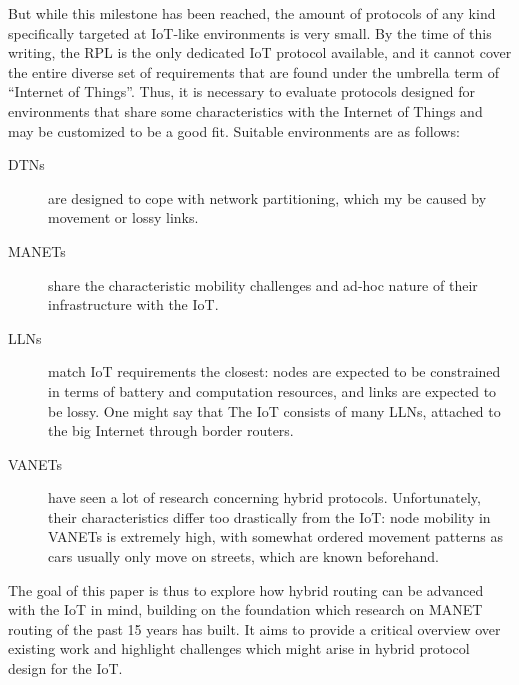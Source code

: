 \documentclass[a4paper,10pt]{scrartcl}
\begin{document}
But while this milestone has been reached, the amount of protocols of any kind specifically targeted at IoT-like environments is very small. By the time of this writing, the \gls{RPL}\cite{RFC-6550} is the only dedicated IoT protocol available, and it cannot cover the entire diverse set of requirements that are found under the umbrella term of ``Internet of Things''. Thus, it is necessary to evaluate protocols designed for environments that share some characteristics with the Internet of Things and may be customized to be a good fit. Suitable environments are as follows:
\begin{description}
\item[\glspl{DTN}] are designed to cope with network partitioning, which my be caused by movement or lossy links.
\item[\glspl{MANET}] share the characteristic mobility challenges and ad-hoc nature of their infrastructure with the IoT.
\item[\glspl{LLN}] match IoT requirements the closest: nodes are expected to be constrained in terms of battery and computation resources, and links are expected to be lossy. One might say that The IoT consists of many LLNs, attached to the big Internet through border routers.
\item[\glspl{VANET}] have seen a lot of research concerning hybrid protocols. Unfortunately, their characteristics differ too drastically from the IoT: node mobility in VANETs is extremely high, with somewhat ordered movement patterns as cars usually only move on streets, which are known beforehand. %
\end{description}

The goal of this paper is thus to explore how hybrid routing can be advanced with the \gls{IoT} in mind, building on the foundation which research on \gls{MANET} routing of the past 15 years has built. It aims to provide a critical overview over existing work and highlight challenges which might arise in hybrid protocol design for the IoT.\\
\end{document}
